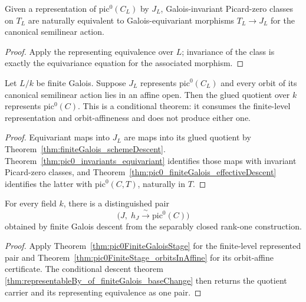 \begin{theorem}
  \label{thm:pic0_invariants_equivariant}
  \leanok
  Given a representation of \(\mathrm{pic}^0(C_L)\) by \(J_L\), Galois-invariant Picard-zero
  classes on \(T_L\) are naturally equivalent to Galois-equivariant morphisms
  \(T_L\to J_L\) for the canonical semilinear action.
\end{theorem}
\begin{proof}
  \leanok
  Apply the representing equivalence over \(L\); invariance of the class is exactly the
  equivariance equation for the associated morphism.
\end{proof}

\begin{theorem}
  \label{thm:representableBy_of_finiteGalois_baseChange}
  \leanok
  Let \(L/k\) be finite Galois.  Suppose \(J_L\) represents
  \(\mathrm{pic}^0(C_L)\) and every orbit of its canonical semilinear action lies in an affine
  open.  Then the glued quotient over \(k\) represents \(\mathrm{pic}^0(C)\).  This is a
  conditional theorem: it consumes the finite-level representation and orbit-affineness and
  does not produce either one.
\end{theorem}
\begin{proof}
  \leanok
  Equivariant maps into \(J_L\) are maps into its glued quotient by
  Theorem~\ref{thm:finiteGalois_schemeDescent}.  Theorem~\ref{thm:pic0_invariants_equivariant}
  identifies those maps with invariant Picard-zero classes, and
  Theorem~\ref{thm:pic0_finiteGalois_effectiveDescent} identifies the latter with
  \(\mathrm{pic}^0(C,T)\), naturally in \(T\).
\end{proof}

\begin{definition}
  \label{def:pic0_representableBy}
  \notready
  For every field \(k\), there is a distinguished pair
  \[
    \bigl(J,\;h_J\xrightarrow{\ \sim\ }\mathrm{pic}^0(C)\bigr)
  \]
  obtained by finite Galois descent from the separably closed rank-one construction.
\end{definition}
\begin{proof}
  Apply Theorem~\ref{thm:pic0FiniteGaloisStage} for the finite-level represented pair and
  Theorem~\ref{thm:pic0FiniteStage_orbitsInAffine} for its orbit-affine certificate.  The
  conditional descent theorem
  \ref{thm:representableBy_of_finiteGalois_baseChange} then returns the quotient carrier and
  its representing equivalence as one pair.
\end{proof}

